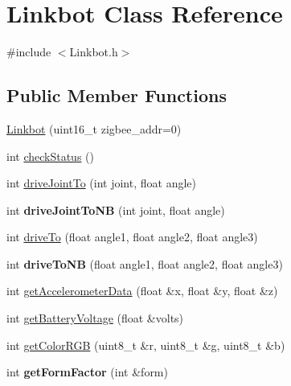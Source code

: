 \hypertarget{classLinkbot}{\section{Linkbot Class Reference}
\label{classLinkbot}
}


{\ttfamily \#include $<$Linkbot.\-h$>$}

\subsection*{Public Member Functions}
\begin{DoxyCompactItemize}
\item 
\hyperlink{classLinkbot_a8bf4eeca5eaa6ceba1a3b117f4a24946}{Linkbot} (uint16\-\_\-t zigbee\-\_\-addr=0)
\item 
int \hyperlink{classLinkbot_ac041a6b957662acdb62b4c598a5f235b}{check\-Status} ()
\item 
int \hyperlink{classLinkbot_ad0acc87ca18cf924eec48a7c2fb76fc0}{drive\-Joint\-To} (int joint, float angle)
\item 
\hypertarget{classLinkbot_a6efaf41b9105197376e94576668fc2df}{int {\bfseries drive\-Joint\-To\-N\-B} (int joint, float angle)}\label{classLinkbot_a6efaf41b9105197376e94576668fc2df}

\item 
int \hyperlink{classLinkbot_a90f54f70b678d1fd1b7bcf6c6abf7389}{drive\-To} (float angle1, float angle2, float angle3)
\item 
\hypertarget{classLinkbot_a6aa9af526e7472fdee725bb66f9619ff}{int {\bfseries drive\-To\-N\-B} (float angle1, float angle2, float angle3)}\label{classLinkbot_a6aa9af526e7472fdee725bb66f9619ff}

\item 
int \hyperlink{classLinkbot_a5d5bf7f7ebeda747cb2fd9a818dda95f}{get\-Accelerometer\-Data} (float \&x, float \&y, float \&z)
\item 
int \hyperlink{classLinkbot_a80212134912c03365e5a60c3b7741a02}{get\-Battery\-Voltage} (float \&volts)
\item 
int \hyperlink{classLinkbot_aec42bb97bed7ab0e738a23c3840d02ba}{get\-Color\-R\-G\-B} (uint8\-\_\-t \&r, uint8\-\_\-t \&g, uint8\-\_\-t \&b)
\item 
\hypertarget{classLinkbot_a06528a339ac1d7d94790ba2ce4329f4a}{int {\bfseries get\-Form\-Factor} (int \&form)}\label{classLinkbot_a06528a339ac1d7d94790ba2ce4329f4a}


\end{DoxyCompactItemize}
